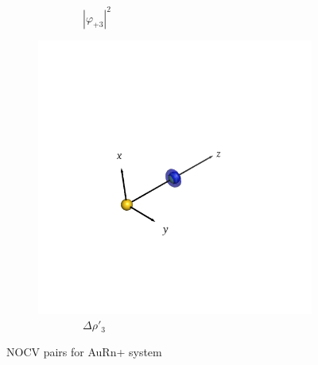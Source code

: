 \documentclass[journal=inoraj,manuscript=article]{achemso}
\begin{document}
\begin{figure}[!h]
\begin{subfigure}[t]{0.32\textwidth}
        \caption*{\ \ \ \ \ \ \ \ $|\varphi_{+3}|^2$} 
    \end{subfigure}
    \hfill
    \begin{subfigure}[t]{0.32\textwidth}
        \centering
        \includegraphics[width=\linewidth]{./AuRn+/pair5.png} 
        \caption*{\ \ \ \ \ \ \ \ $\Delta \rho'_3$} 
    \end{subfigure}

\caption{NOCV pairs for AuRn+ system}
\end{figure}
\end{document}
